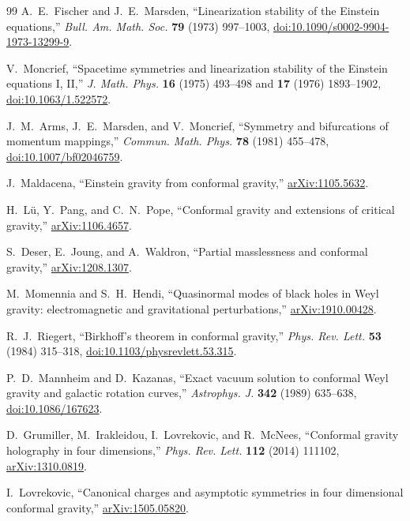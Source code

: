 \documentclass[11pt]{article}
\begin{document}
\begin{thebibliography}{99}
A.~E.~Fischer and J.~E.~Marsden,
``Linearization stability of the Einstein equations,''
\emph{Bull. Am. Math. Soc.} \textbf{79} (1973) 997--1003,
\href{https://doi.org/10.1090/s0002-9904-1973-13299-9}{doi:10.1090/s0002-9904-1973-13299-9}.

V.~Moncrief,
``Spacetime symmetries and linearization stability of the Einstein equations
I, II,'' \emph{J. Math. Phys.} \textbf{16} (1975) 493--498 and
\textbf{17} (1976) 1893--1902,
\href{https://doi.org/10.1063/1.522572}{doi:10.1063/1.522572}.

J.~M.~Arms, J.~E.~Marsden, and V.~Moncrief,
``Symmetry and bifurcations of momentum mappings,''
\emph{Commun. Math. Phys.} \textbf{78} (1981) 455--478,
\href{https://doi.org/10.1007/bf02046759}{doi:10.1007/bf02046759}.

J.~Maldacena,
``Einstein gravity from conformal gravity,''
\href{https://arxiv.org/abs/1105.5632}{arXiv:1105.5632}.

H.~L\"u, Y.~Pang, and C.~N.~Pope,
``Conformal gravity and extensions of critical gravity,''
\href{https://arxiv.org/abs/1106.4657}{arXiv:1106.4657}.

S.~Deser, E.~Joung, and A.~Waldron,
``Partial masslessness and conformal gravity,''
\href{https://arxiv.org/abs/1208.1307}{arXiv:1208.1307}.

M.~Momennia and S.~H.~Hendi,
``Quasinormal modes of black holes in Weyl gravity: electromagnetic and
gravitational perturbations,''
\href{https://arxiv.org/abs/1910.00428}{arXiv:1910.00428}.

R.~J.~Riegert,
``Birkhoff's theorem in conformal gravity,''
\emph{Phys. Rev. Lett.} \textbf{53} (1984) 315--318,
\href{https://doi.org/10.1103/physrevlett.53.315}{doi:10.1103/physrevlett.53.315}.

P.~D.~Mannheim and D.~Kazanas,
``Exact vacuum solution to conformal Weyl gravity and galactic rotation
curves,'' \emph{Astrophys. J.} \textbf{342} (1989) 635--638,
\href{https://doi.org/10.1086/167623}{doi:10.1086/167623}.

D.~Grumiller, M.~Irakleidou, I.~Lovrekovic, and R.~McNees,
``Conformal gravity holography in four dimensions,''
\emph{Phys. Rev. Lett.} \textbf{112} (2014) 111102,
\href{https://arxiv.org/abs/1310.0819}{arXiv:1310.0819}.

I.~Lovrekovic,
``Canonical charges and asymptotic symmetries in four dimensional conformal
gravity,'' \href{https://arxiv.org/abs/1505.05820}{arXiv:1505.05820}.


\end{thebibliography}
\end{document}
